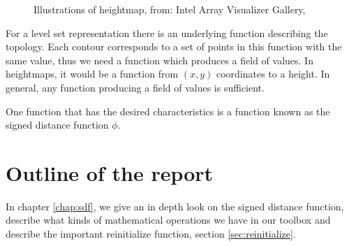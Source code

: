 \begin{figure}[h]
\begin{center}
\end{center}
\caption{Illustrations of heightmap, from: Intel Array Visualizer
  Gallery, }
\label{fig:heightmap}
\end{figure}


For a level set representation there is an underlying function
describing the topology. Each contour corresponds to a set of points
in this function with the same value, thus we need a function which
produces a field of values. In heightmaps, it would be a function from
$(x,y)$ coordinates to a height. In general, any function producing a
field of values is sufficient.  

One function that has the desired characteristics is a function known
as the signed distance function $\phi$.


\section*{Outline of the report}

In chapter \vref{chap:sdf}, we give an in depth look on the signed
distance function, describe what kinds of mathematical operations we
have in our toolbox and describe the important reinitialize function,
section \vref{sec:reinitialize}.


